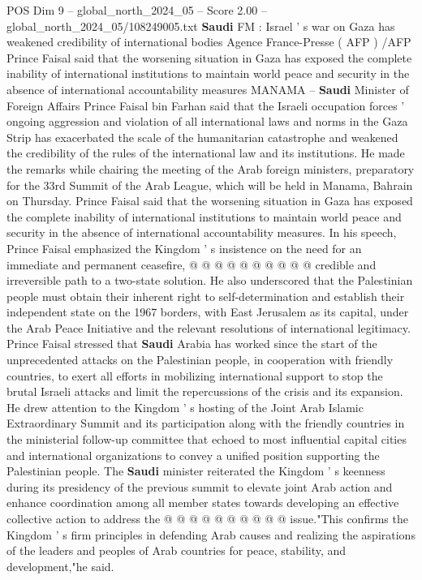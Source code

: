 \begin{textsample}{POS Dim 9 – global\_north\_2024\_05 – Score 2.00 – global\_north\_2024\_05/108249005.txt}  \label{ex:f9_pos_209}
\textbf{Saudi} FM : Israel ' s war on Gaza has weakened credibility of international bodies Agence France-Presse ( AFP ) /AFP Prince Faisal said that the worsening situation in Gaza has exposed the complete inability of international institutions to maintain world peace and security in the absence of international accountability measures MANAMA -- \textbf{Saudi} Minister of Foreign Affairs Prince Faisal bin Farhan said that the Israeli occupation forces ' ongoing aggression and violation of all international laws and norms in the Gaza Strip has exacerbated the scale of the humanitarian catastrophe and weakened the credibility of the rules of the international law and its institutions.
He made the remarks while chairing the meeting of the Arab foreign ministers, preparatory for the 33rd Summit of the Arab League, which will be held in Manama, Bahrain on Thursday.
Prince Faisal said that the worsening situation in Gaza has exposed the complete inability of international institutions to maintain world peace and security in the absence of international accountability measures.
In his speech, Prince Faisal emphasized the Kingdom ' s insistence on the need for an immediate and permanent ceasefire, @ @ @ @ @ @ @ @ @ @ credible and irreversible path to a two-state solution.
He also underscored that the Palestinian people must obtain their inherent right to self-determination and establish their independent state on the 1967 borders, with East Jerusalem as its capital, under the Arab Peace Initiative and the relevant resolutions of international legitimacy.
Prince Faisal stressed that \textbf{Saudi} Arabia has worked since the start of the unprecedented attacks on the Palestinian people, in cooperation with friendly countries, to exert all efforts in mobilizing international support to stop the brutal Israeli attacks and limit the repercussions of the crisis and its expansion.
He drew attention to the Kingdom ' s hosting of the Joint Arab Islamic Extraordinary Summit and its participation along with the friendly countries in the ministerial follow-up committee that echoed to most influential capital cities and international organizations to convey a unified position supporting the Palestinian people.
The \textbf{Saudi} minister reiterated the Kingdom ' s keenness during its presidency of the previous summit to elevate joint Arab action and enhance coordination among all member states towards developing an effective collective action to address the @ @ @ @ @ @ @ @ @ @ issue."This confirms the Kingdom ' s firm principles in defending Arab causes and realizing the aspirations of the leaders and peoples of Arab countries for peace, stability, and development,"he said.

\end{textsample}
